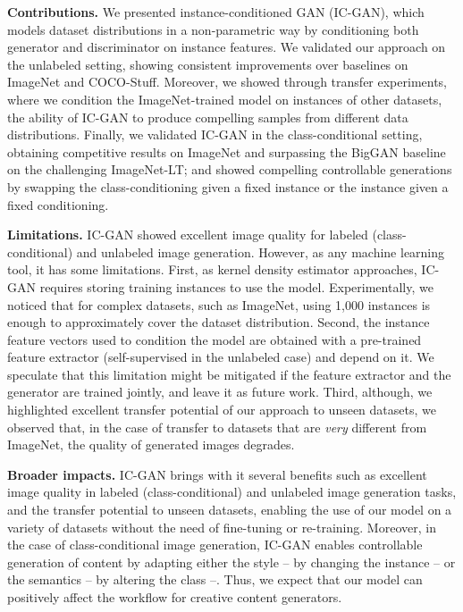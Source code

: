 \textbf{Contributions.}
We presented instance-conditioned GAN ({IC-GAN}), which  models  dataset distributions in a non-parametric way by conditioning both  generator and discriminator on instance features. We validated our approach on the unlabeled setting, showing consistent improvements over baselines on ImageNet and COCO-Stuff. Moreover, we showed through transfer experiments, where we condition the ImageNet-trained model on instances of other datasets, the ability of {IC-GAN}  to produce compelling samples from different data distributions. Finally, we validated {IC-GAN} in the class-conditional setting, obtaining competitive results on ImageNet and surpassing the BigGAN baseline on the challenging  ImageNet-LT; and showed compelling controllable generations by swapping the class-conditioning given a fixed instance or the instance given a fixed conditioning.

\textbf{Limitations.}
{IC-GAN} showed excellent image quality for labeled (class-conditional) and unlabeled image generation. However, as any machine learning tool, it has some limitations. First, as kernel density estimator approaches, {IC-GAN} requires storing training instances to use the model. Experimentally, we noticed that for complex datasets, such as ImageNet, using 1,000 instances is enough to approximately cover the dataset distribution. Second, the instance feature vectors used to condition the model are obtained with a pre-trained feature extractor (self-supervised in the unlabeled case) and depend on it. We speculate that this limitation might be mitigated if the feature extractor and the generator are trained jointly, and leave it as future work. Third, although, we highlighted excellent transfer potential of our approach to unseen datasets, we observed that, in the case of transfer to datasets that are \emph{very} different from ImageNet, the quality of generated images degrades. 

\textbf{Broader impacts.} {IC-GAN} brings with it several benefits such as excellent image quality in labeled (class-conditional) and unlabeled image generation tasks, and the transfer potential to unseen datasets, enabling the use of our model on a variety of datasets without the need of fine-tuning or re-training. Moreover, in the case of class-conditional image generation, {IC-GAN} enables controllable generation of content by adapting either the style -- by changing the instance -- or the semantics -- by altering the class --. Thus, we expect that our model can positively affect the workflow for creative content generators. 

